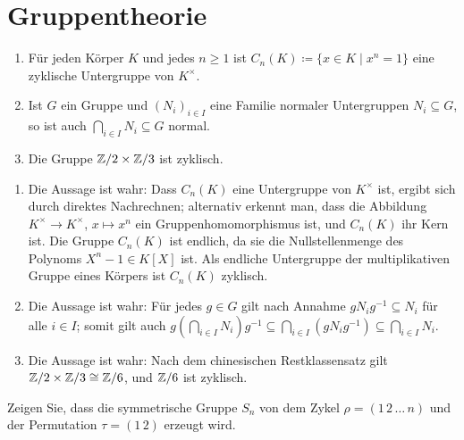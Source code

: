 \section{Gruppentheorie}




\begin{question}[subtitle = Multiple Choice]
  \begin{enumerate}
    \item
      Für jeden Körper $K$ und jedes $n \geq 1$ ist $C_n(K) \coloneqq \{x \in K \mid x^n = 1\}$ eine zyklische Untergruppe von $K^\times$.
    \item
      Ist $G$ ein Gruppe und $(N_i)_{i \in I}$ eine Familie normaler Untergruppen $N_i \subseteq G$, so ist auch $\bigcap_{i \in I} N_i \subseteq G$ normal.
    \item
      Die Gruppe $\mathbb{Z}/2 \times \mathbb{Z}/3$ ist zyklisch.
  \end{enumerate}
\end{question}


\begin{solution}
  \begin{enumerate}
    \item
      Die Aussage ist wahr:
      Dass $C_n(K)$ eine Untergruppe von $K^\times$ ist, ergibt sich durch direktes Nachrechnen;
      alternativ erkennt man, dass die Abbildung $K^\times \to K^\times$, $x \mapsto x^n$ ein Gruppenhomomorphismus ist, und $C_n(K)$ ihr Kern ist.
      Die Gruppe $C_n(K)$ ist endlich, da sie die Nullstellenmenge des Polynoms $X^n - 1 \in K[X]$ ist.
      Als endliche Untergruppe der multiplikativen Gruppe eines Körpers ist $C_n(K)$ zyklisch.
    \item
      Die Aussage ist wahr:
      Für jedes $g \in G$ gilt nach Annahme $g N_i g^{-1} \subseteq N_i$ für alle $i \in I$;
      somit gilt auch $g \left( \bigcap_{i \in I} N_i \right) g^{-1} \subseteq \bigcap_{i \in I} (g N_i g^{-1}) \subseteq \bigcap_{i \in I} N_i$.
    \item
      Die Aussage ist wahr:
      Nach dem chinesischen Restklassensatz gilt $\mathbb{Z}/2 \times \mathbb{Z}/3 \cong \mathbb{Z}/6$, und $\mathbb{Z}/6$ ist zyklisch.
  \end{enumerate}
\end{solution}


\begin{question}
  Zeigen Sie, dass die symmetrische Gruppe $S_n$ von dem Zykel $\rho = (1 \, 2 \, \dotso \, n)$ und der Permutation $\tau = (1 \, 2)$ erzeugt wird.
\end{question}


